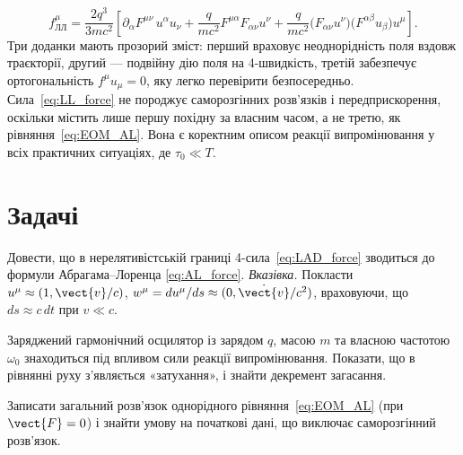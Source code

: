 \begin{equation}\label{eq:LL_force}
	f^{\mu}_\text{ЛЛ} = \frac{2q^3}{3mc^2}
	\left[
		\partial_{\alpha}F^{\mu\nu}\,u^{\alpha}u_{\nu}
		+ \frac{q}{mc^2}F^{\mu\alpha}F_{\alpha\nu}u^{\nu}
		+ \frac{q}{mc^2}
		  \bigl(F_{\alpha\nu}u^{\nu}\bigr)\!\bigl(F^{\alpha\beta}u_{\beta}\bigr)
		  u^{\mu}
	\right].
\end{equation}
Три доданки мають прозорий зміст: перший враховує неоднорідність поля
вздовж траєкторії, другий --- подвійну дію поля на 4-швидкість, третій
забезпечує ортогональність $f^{\mu}u_{\mu}=0$, яку легко
перевірити безпосередньо. Сила~\eqref{eq:LL_force} не породжує
саморозгінних розв'язків і передприскорення, оскільки містить лише
першу похідну за власним часом, а не третю, як рівняння~\eqref{eq:EOM_AL}.
Вона є коректним описом реакції випромінювання у всіх практичних
ситуаціях, де $\tau_0 \ll T$.

\section*{Задачі}

\begin{problem}
	Довести, що в нерелятивістській границі 4-сила~\eqref{eq:LAD_force} зводиться до формули Абрагама–Лоренца
	\eqref{eq:AL_force}.
	\emph{Вказівка.} Покласти $u^{\mu} \approx (1, \vect{v}/c)$, $w^{\mu} = du^{\mu}/ds \approx (0, \dot{\vect{v}}/c^2)$,
	враховуючи, що $ds \approx c\,dt$ при $v \ll c$.
\end{problem}

\begin{problem}
	Заряджений гармонічний осцилятор із зарядом $q$, масою $m$ та власною частотою $\omega_0$ знаходиться під впливом
	сили реакції випромінювання. Показати, що в рівнянні руху з'являється «затухання», і знайти декремент загасання.

\end{problem}

\begin{problem}\label{prb:runaway}
	Записати загальний розв'язок однорідного рівняння~\eqref{eq:EOM_AL} (при $\vect{F}=0$) і знайти умову на початкові
	дані, що виключає саморозгінний розв'язок.

\end{problem}

